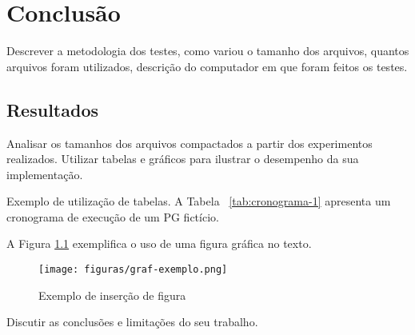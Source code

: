 \chapter{Conclusão}\label{cap-conclusao}

Descrever a metodologia dos testes, como variou o tamanho dos arquivos, quantos arquivos foram utilizados, descrição do computador em que foram feitos os testes.

\section{Resultados}

Analisar os tamanhos dos arquivos compactados a partir dos experimentos realizados. Utilizar tabelas e gráficos para ilustrar o desempenho da sua implementação.

Exemplo de utilização de tabelas.  A Tabela ~\ref{tab:cronograma-1} apresenta um cronograma de execução de um PG fictício.


\begin{table}[htb]
	\centering
	\caption{Cronograma de Atividades do primeiro semestre.}
	\label{tab:cronograma-1}
\end{table}


A Figura \ref{fig:graf} exemplifica o uso de uma figura gráfica no texto.


   \begin{figure}[!htb]
    \centering
   	\texttt{[image: figuras/graf-exemplo.png]}
   	\caption{Exemplo de inserção de figura}
   	\label{fig:graf}
   \end{figure}


Discutir as conclusões e limitações do seu trabalho.
